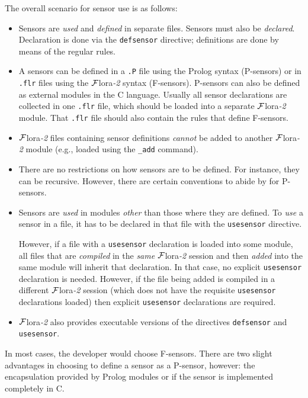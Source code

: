 \documentclass[11pt]{article}
\newcommand{\FLORA}{{\mbox{\sc ${\cal F}${lora}\rm\emph{-2}}}\xspace}
\begin{document}
The overall scenario for sensor use is as follows:
\begin{itemize}
\item  Sensors are \emph{used} and \emph{defined} in separate files.
  Sensors must also be \emph{declared}. 
  Declaration is done via the
  \texttt{defsensor} directive; definitions are done by means of the
  regular rules.
\item
  A sensors can be defined in a \texttt{.P} file
  using the Prolog syntax (P-sensors)  or in
  \texttt{.flr} files using the \FLORA syntax (F-sensors). 
  P-sensors can also be defined as external modules in the C language.
  Usually all sensor declarations are collected in one \texttt{.flr}
  file, which should be loaded into a separate \FLORA module. That
  \texttt{.flr} file 
  should also contain the rules that define F-sensors. 
\item 
  \FLORA files containing sensor definitions \emph{cannot} be added to
  another \FLORA module (e.g., loaded 
  using the \texttt{\_add} command).
\item
  There are no restrictions on how sensors are to be defined. For instance,
  they can be recursive. However, there are certain conventions to abide by
  for P-sensors.
\item  Sensors are \emph{used} in modules \emph{other} than those where they
  are defined. To \emph{use} a sensor in a file, it has to be declared
  in that file with the \texttt{usesensor} directive.

  However, if a file with a \texttt{usesensor} declaration is loaded into
  some module, all
  files that are \emph{compiled} in the \emph{same} \FLORA session  
  and then \emph{added}  into the same module will inherit that declaration.
  In that case, no explicit \texttt{usesensor} declaration is needed.
  However, if the file being added is compiled in a different \FLORA
  session (which does not have the requisite \texttt{usesensor}
  declarations loaded) then explicit \texttt{usesensor} declarations are
  required.  
\item \FLORA also provides executable versions of the directives 
  \texttt{defsensor} and \texttt{usesensor}.  
\end{itemize}

In most cases, the developer would choose F-sensors. There are two slight
advantages in choosing to define a sensor as a P-sensor, however: the encapsulation
provided by Prolog modules or if the sensor is implemented completely in C.
\end{document}
